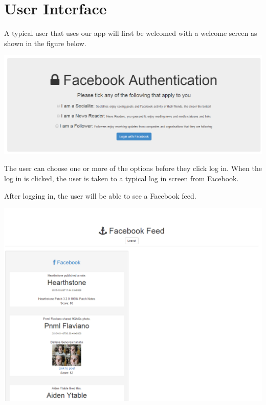 \section{User Interface}

A typical user that uses our app will first be welcomed with a welcome screen as shown in the figure below.

\begin{center}
  \includegraphics[scale=0.5]{images/mainscreen.png}
\end{center}

The user can choose one or more of the options before they click log in. When the log in is clicked, the user is taken to a typical log in screen from Facebook.

After logging in, the user will be able to see a Facebook feed.

\begin{center}
  \includegraphics[scale=0.5]{images/rankedFeed.png}
\end{center}

